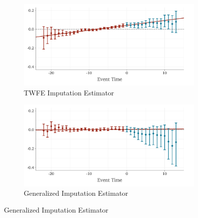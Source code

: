 \documentclass[12pt]{article}
\begin{document}
\begin{figure}
\caption{Effect of Walmart on County $\log$ Wholesale Retail Employment}
\label{fig:walmart_wholesale}

\begin{center}
\begin{subfigure}[b]{0.75\textwidth}
  \caption{TWFE Imputation Estimator}
  \begin{adjustbox}{width=\textwidth, center}
    \includegraphics{../figures/plot_did2s_wholesale.pdf}
  \end{adjustbox}
\end{subfigure}
\end{center}
\begin{center}
\begin{subfigure}[b]{0.75\textwidth}
  \caption{Generalized Imputation Estimator}
  \begin{adjustbox}{width=\textwidth, center}
    \includegraphics{../figures/plot_qld_wholesale.pdf}
  \end{adjustbox}
\end{subfigure}
\end{center}


\end{figure}
\end{document}
